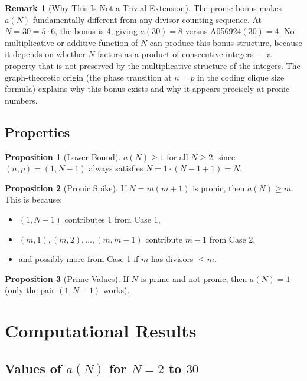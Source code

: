 \documentclass[11pt,a4paper]{article}
\theoremstyle{definition}
\newtheorem{proposition}{Proposition}[section]
\newtheorem{remark}{Remark}[section]
\begin{document}
\begin{remark}[Why This Is Not a Trivial Extension]
The pronic bonus makes $a(N)$ fundamentally different from any divisor-counting sequence. At $N = 30 = 5 \cdot 6$, the bonus is 4, giving $a(30) = 8$ versus A056924$(30) = 4$. No multiplicative or additive function of $N$ can produce this bonus structure, because it depends on whether $N$ factors as a product of consecutive integers --- a property that is not preserved by the multiplicative structure of the integers. The graph-theoretic origin (the phase transition at $n = p$ in the coding clique size formula) explains why this bonus exists and why it appears precisely at pronic numbers.
\end{remark}

\subsection{Properties}

\begin{proposition}[Lower Bound]
$a(N) \geq 1$ for all $N \geq 2$, since $(n, p) = (1, N-1)$ always satisfies $N = 1 \cdot (N-1+1) = N$.
\end{proposition}

\begin{proposition}[Pronic Spike]
If $N = m(m+1)$ is pronic, then $a(N) \geq m$. This is because:
\begin{itemize}
\item $(1, N-1)$ contributes 1 from Case 1,
\item $(m, 1), (m, 2), \ldots, (m, m-1)$ contribute $m - 1$ from Case 2,
\item and possibly more from Case 1 if $m$ has divisors $\leq m$.
\end{itemize}
\end{proposition}

\begin{proposition}[Prime Values]
If $N$ is prime and not pronic, then $a(N) = 1$ (only the pair $(1, N-1)$ works).
\end{proposition}

\section{Computational Results}

\subsection{Values of $a(N)$ for $N = 2$ to $30$}
\end{document}
